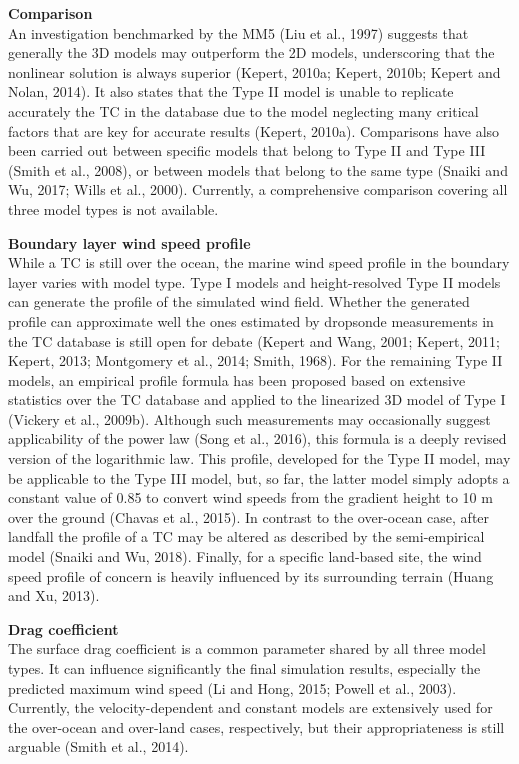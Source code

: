 \noindent\textbf{Comparison } \\An investigation benchmarked by the MM5 (Liu et al., 1997) suggests that generally the 3D models may outperform the 2D models, underscoring that the nonlinear solution is always superior (Kepert, 2010a; Kepert, 2010b; Kepert and Nolan, 2014). It also states that the Type II model is unable to replicate accurately the TC in the database due to the model neglecting many critical factors that are key for accurate results (Kepert, 2010a). Comparisons have also been carried out between specific models that belong to Type II and Type III (Smith et al., 2008), or between models that belong to the same type (Snaiki and Wu, 2017; Wills et al., 2000). Currently, a comprehensive comparison covering all three model types is not available. 
\newline

\noindent\textbf{Boundary layer wind speed profile} \\While a TC is still over the ocean, the marine wind speed profile in the boundary layer varies with model type. Type I models and height-resolved Type II models can generate the profile of the simulated wind field. Whether the generated profile can approximate well the ones estimated by dropsonde measurements in the TC database is still open for debate (Kepert and Wang, 2001; Kepert, 2011; Kepert, 2013; Montgomery et al., 2014; Smith, 1968). For the remaining Type II models, an empirical profile formula has been proposed based on extensive statistics over the TC database and applied to the linearized 3D model of Type I (Vickery et al., 2009b). Although such measurements may occasionally suggest applicability of the power law (Song et al., 2016), this formula is a deeply revised version of the logarithmic law. This profile, developed for the Type II model, may be applicable to the Type III model, but, so far, the latter model simply adopts a constant value of 0.85 to convert wind speeds from the gradient height to 10 m over the ground (Chavas et al., 2015). In contrast to the over-ocean case, after landfall the profile of a TC may be altered as described by the semi-empirical model (Snaiki and Wu, 2018). Finally, for a specific land-based site, the wind speed profile of concern is heavily influenced by its surrounding terrain (Huang and Xu, 2013).
\newline

\noindent\textbf{Drag coefficient} \\The surface drag coefficient is a common parameter shared by all three model types. It can influence significantly the final simulation results, especially the predicted maximum wind speed (Li and Hong, 2015; Powell et al., 2003). Currently, the velocity-dependent and constant models are extensively used for the over-ocean and over-land cases, respectively, but their appropriateness is still arguable (Smith et al., 2014). 
\newline

